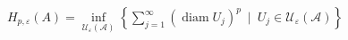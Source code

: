 \documentclass[preview]{standalone}
\begin{document}
\begin{align*}
H_{p,\varepsilon}(A) = \inf_{\mathcal{U_\varepsilon(A)}} \left\{ \sum_{j=1}^\infty (\operatorname{diam} U_j)^p \ \mid \ U_j \in \mathcal{U_\varepsilon(A)}   \right\}
\end{align*}
\end{document}
